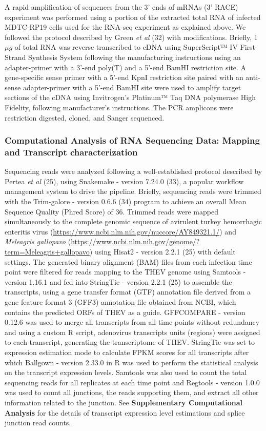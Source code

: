 \documentclass[
]{article}
\begin{document}
A rapid amplification of sequences from the 3' ends of mRNAs (3' RACE)
experiment was performed using a portion of the extracted total RNA of
infected MDTC-RP19 cells used for the RNA-seq experiment as explained
above. We followed the protocol described by Green \emph{et al} (32)
with modifications. Briefly, 1\(\mu g\) of total RNA was reverse
transcribed to cDNA using SuperScript™ IV First-Strand Synthesis System
following the manufacturing instructions using an adapter-primer with a
3'-end poly(T) and a 5'-end BamHI restriction site. A gene-specific
sense primer with a 5'-end KpnI restriction site paired with an
anti-sense adapter-primer with a 5'-end BamHI site were used to amplify
target sections of the cDNA using Invitrogen's Platinum™ Taq DNA
polymerase High Fidelity, following manufacturer's instructions. The PCR
amplicons were restriction digested, cloned, and Sanger sequenced.

\subsubsection{Computational Analysis of RNA Sequencing Data: Mapping
and Transcript
characterization}\label{computational-analysis-of-rna-sequencing-data-mapping-and-transcript-characterization}

Sequencing reads were analyzed following a well-established protocol
described by Pertea \emph{et al} (25), using Snakemake - version 7.24.0
(33), a popular workflow management system to drive the pipeline.
Briefly, sequencing reads were trimmed with the Trim-galore - version
0.6.6 (34) program to achieve an overall Mean Sequence Quality (Phred
Score) of 36. Trimmed reads were mapped simultaneously to the complete
genomic sequence of avirulent turkey hemorrhagic enteritis virus
(\url{https://www.ncbi.nlm.nih.gov/nuccore/AY849321.1/}) and
\emph{Meleagris gallopavo}
(\url{https://www.ncbi.nlm.nih.gov/genome/?term=Meleagris+gallopavo})
using Hisat2 - version 2.2.1 (25) with default settings. The generated
binary alignment (BAM) files from each infection time point were
filtered for reads mapping to the THEV genome using Samtools - version
1.16.1 and fed into StringTie - version 2.2.1 (25) to assemble the
transcripts, using a gene transfer format (GTF) annotation file derived
from a gene feature format 3 (GFF3) annotation file obtained from NCBI,
which contains the predicted ORFs of THEV as a guide. GFFCOMPARE -
version 0.12.6 was used to merge all transcripts from all time points
without redundancy and using a custom R script, adenovirus transcripts
units (regions) were assigned to each transcript, generating the
transcriptome of THEV. StringTie was set to expression estimation mode
to calculate FPKM scores for all transcripts after which Ballgown -
version 2.33.0 in R was used to perform the statistical analysis on the
transcript expression levels. Samtools was also used to count the total
sequencing reads for all replicates at each time point and Regtools -
version 1.0.0 was used to count all junctions, the reads supporting
them, and extract all other information related to the junction. See
\textbf{Supplementary Computational Analysis} for the details of
transcript expression level estimations and splice junction read counts.
\newpage
\end{document}
